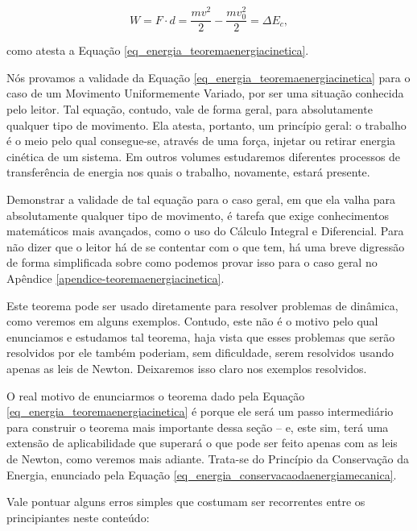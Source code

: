 $$ W = F \cdot d = \dfrac{mv^2}{2} - \dfrac{mv_0^2}{2} = \Delta E_c, $$

\noindent como atesta a Equação \eqref{eq_energia_teoremaenergiacinetica}.


Nós provamos a validade da Equação \eqref{eq_energia_teoremaenergiacinetica} para o caso de um Movimento Uniformemente Variado, por ser uma situação conhecida pelo leitor. Tal equação, contudo, vale de forma geral, para absolutamente qualquer tipo de movimento. Ela atesta, portanto, um princípio geral: o trabalho é o meio pelo qual consegue-se, através de uma força, injetar ou retirar energia cinética de um sistema. Em outros volumes estudaremos diferentes processos de transferência de energia nos quais o trabalho, novamente, estará presente.

Demonstrar a validade de tal equação para o caso geral, em que ela valha para absolutamente qualquer tipo de movimento, é tarefa que exige conhecimentos matemáticos mais avançados, como o uso do Cálculo Integral e Diferencial. Para não dizer que o leitor há de se contentar com o que tem, há uma breve digressão de forma simplificada sobre como podemos provar isso para o caso geral no Apêndice \ref{apendice-teoremaenergiacinetica}.


Este teorema pode ser usado diretamente para resolver problemas de dinâmica, como veremos em alguns exemplos. Contudo, este não é o motivo pelo qual enunciamos e estudamos tal teorema, haja vista que esses problemas que serão resolvidos por ele também poderiam, sem dificuldade, serem resolvidos usando apenas as leis de Newton. Deixaremos isso claro nos exemplos resolvidos.

O real motivo de enunciarmos o teorema dado pela Equação \eqref{eq_energia_teoremaenergiacinetica} é porque ele será um passo intermediário para construir o teorema mais importante dessa seção -- e, este sim, terá uma extensão de aplicabilidade que superará o que pode ser feito apenas com as leis de Newton, como veremos mais adiante. Trata-se do Princípio da Conservação da Energia, enunciado pela Equação \eqref{eq_energia_conservacaodaenergiamecanica}.




Vale pontuar alguns erros simples que costumam ser recorrentes entre os principiantes neste conteúdo:

